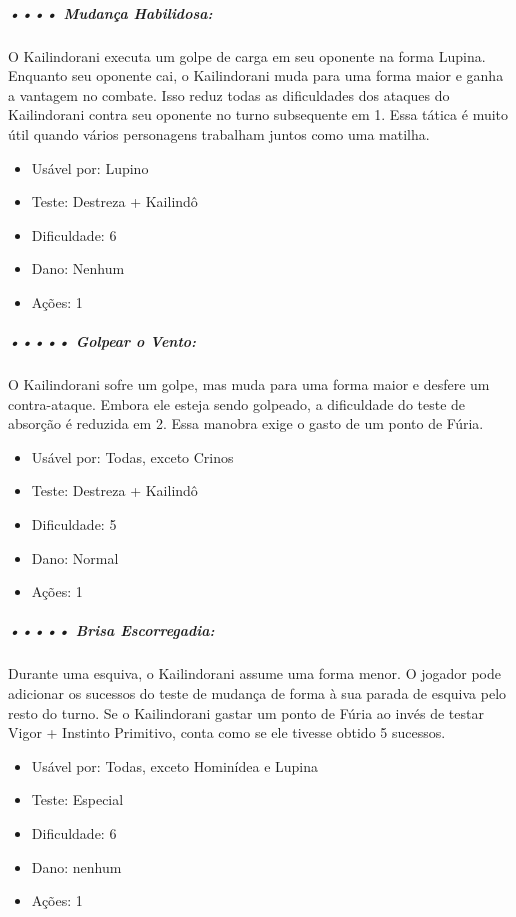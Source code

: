 \subparagraph{\bf •••• Mudança Habilidosa:}
O Kailindorani executa um golpe de carga em seu oponente na forma Lupina. Enquanto seu oponente cai, o Kailindorani muda para uma forma maior e ganha a vantagem no combate. Isso reduz todas as dificuldades dos ataques do Kailindorani contra seu oponente no turno subsequente em 1. Essa tática é muito útil quando vários personagens trabalham juntos como uma matilha. 
\begin{itemize}[noitemsep]
\item Usável por: Lupino
\item Teste: Destreza + Kailindô 
\item Dificuldade: 6
\item Dano: Nenhum 
\item Ações: 1
\end{itemize}

\subparagraph{\bf ••••• Golpear o Vento:}
O Kailindorani sofre um golpe, mas muda para uma forma maior e desfere um contra-ataque. Embora ele esteja sendo golpeado, a dificuldade do teste de absorção é reduzida em 2. Essa manobra exige o gasto de um ponto de Fúria.
\begin{itemize}[noitemsep]
\item Usável por: Todas, exceto Crinos
\item Teste: Destreza + Kailindô 
\item Dificuldade: 5
\item Dano: Normal 
\item Ações: 1
\end{itemize}

\subparagraph{\bf ••••• Brisa Escorregadia:}
Durante uma esquiva, o Kailindorani assume uma forma menor. O jogador pode adicionar os sucessos do teste de mudança de forma à sua parada de esquiva pelo resto do turno. Se o Kailindorani gastar um ponto de Fúria ao invés de testar Vigor + Instinto Primitivo, conta como se ele tivesse obtido 5 sucessos.
\begin{itemize}[noitemsep]
\item Usável por: Todas, exceto Hominídea e Lupina 
\item Teste: Especial 
\item Dificuldade: 6 
\item Dano: nenhum 
\item Ações: 1
\end{itemize}